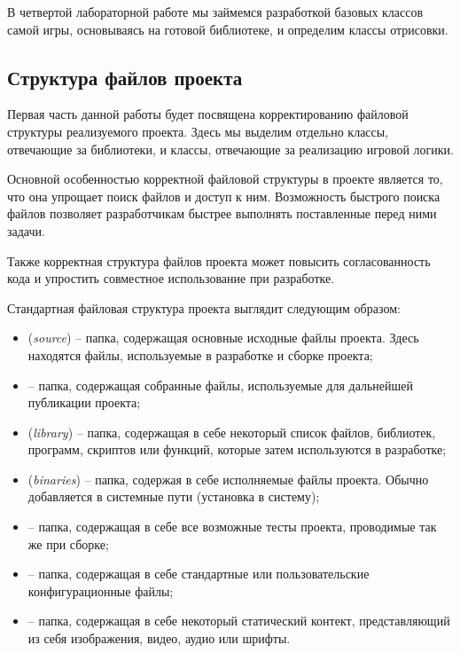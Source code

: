В четвертой лабораторной работе мы займемся разработкой базовых классов самой игры, основываясь на готовой библиотеке, и определим классы отрисовки.


\subsection{Структура файлов проекта}
	
	Первая часть данной работы будет посвящена корректированию файловой структуры реализуемого проекта. Здесь мы выделим отдельно классы, отвечающие за библиотеки, и классы, отвечающие за реализацию игровой логики.

	Основной особенностью корректной файловой структуры в проекте является то, что она упрощает поиск файлов и доступ к ним. Возможность быстрого поиска файлов позволяет разработчикам быстрее выполнять поставленные перед ними задачи. 

	Также корректная структура файлов проекта может повысить согласованность кода и упростить совместное использование при разработке.

	Стандартная файловая структура проекта выглядит следующим образом:
	\begin{itemize}
		\item {} (\textit{source}) -- папка, содержащая основные исходные файлы проекта. Здесь находятся файлы, используемые в разработке и сборке проекта;
		\item {} -- папка, содержащая собранные файлы, используемые для дальнейшей публикации проекта;
		\item {} (\textit{library}) -- папка, содержащая в себе некоторый список файлов, библиотек, программ, скриптов или функций, которые затем используются в разработке;
		\item {} (\textit{binaries}) -- папка, содержая в себе исполняемые файлы проекта. Обычно добавляется в системные пути  (установка в систему);
		\item {} -- папка, содержащая в себе все возможные тесты проекта, проводимые так же при сборке;
		\item {} -- папка, содержащая в себе стандартные или пользовательские конфигурационные файлы;
		\item {} -- папка, содержащая в себе некоторый статический контект, представляющий из себя изображения, видео, аудио или шрифты.
	\end{itemize}

